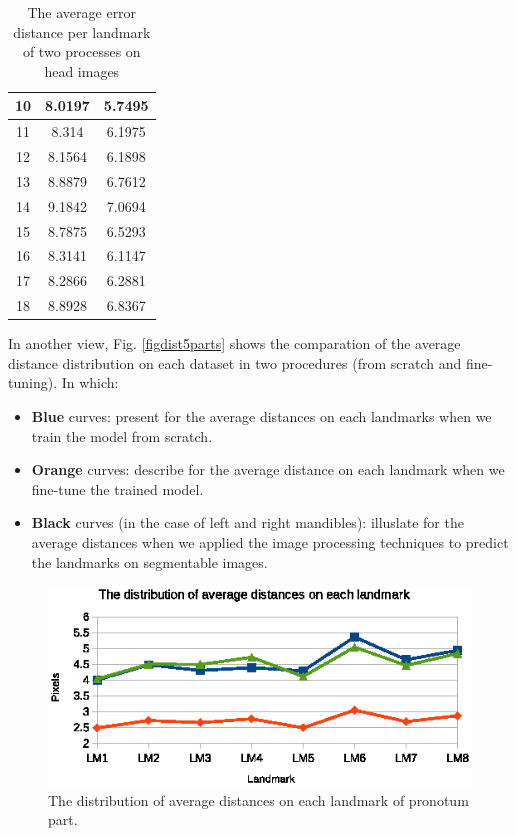 \documentclass[review]{elsarticle}
\begin{document}
\begin{table}[htbp]
\begin{minipage}[t]{0.45\textwidth}
\begin{tabular}{|c|c|c|}
	10 & 8.0197 & 5.7495 \\ \hline
	11 & 8.314 & 6.1975 \\ \hline
	12 & 8.1564 & 6.1898 \\ \hline
	13 & 8.8879 & 6.7612 \\ \hline
	14 & 9.1842 & 7.0694 \\ \hline
	15 & 8.7875 & 6.5293 \\ \hline
	16 & 8.3141 & 6.1147 \\ \hline
	17 & 8.2866 & 6.2881 \\ \hline
	18 & 8.8928 & 6.8367 \\ \hline
\end{tabular}
\caption{The average error distance per landmark of two processes on head images}
\label{tblcmpmd}
\end{minipage}
\end{table}

In another view, Fig. \ref{figdist5parts} shows the comparation of the average distance distribution on each dataset in two procedures (from scratch and fine-tuning). In which:
\begin{itemize}
	\item \textbf{Blue} curves: present for the average distances on each landmarks when we train the model from scratch.
	\item \textbf{Orange} curves: describe for the average distance on each landmark when we fine-tune the trained model.
	\item \textbf{Black} curves (in the case of left and right mandibles): illuslate for the average distances when we applied the image processing techniques to predict the landmarks on segmentable images.
\end{itemize}

\iffalse
\begin{figure}[htbp]
	\centerline{\includegraphics[scale=0.55]{images/prono_part}}
	\caption{The distribution of average distances on each landmark of pronotum part.}
	\label{figdistpronotum}
\end{figure}
\end{document}
